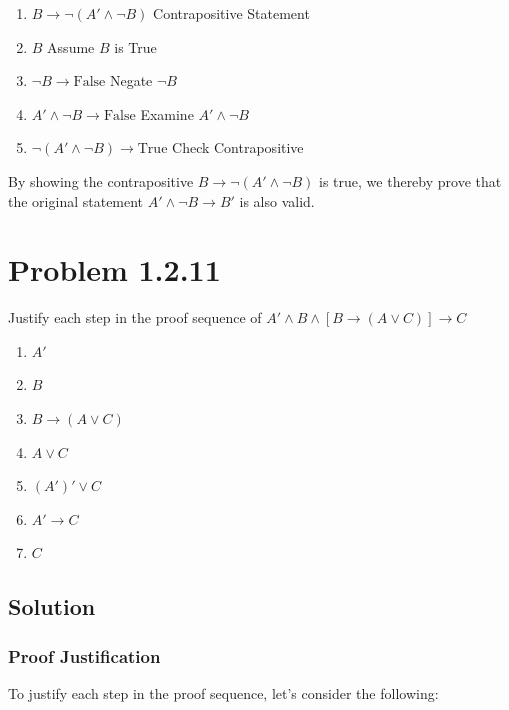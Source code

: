 \documentclass[12pt]{article}
\begin{document}
\begin{enumerate}
    \item \( B \to \lnot (A' \land \lnot B) \) \hfill Contrapositive Statement
    
    \item \( B \) \hfill Assume \( B \) is True
    
    \item \( \lnot B \to \text{False} \) \hfill Negate \( \lnot B \)
    
    \item \( A' \land \lnot B \to \text{False} \) \hfill Examine \( A' \land \lnot B \)
    
    \item \( \lnot (A' \land \lnot B) \to \text{True} \) \hfill Check Contrapositive
\end{enumerate}

By showing the contrapositive \( B \to \lnot (A' \land \lnot B) \) is true, we thereby prove that the original statement \( A' \land \lnot B \to B' \) is also valid.



\newpage
\section*{Problem 1.2.11}
Justify each step in the proof sequence of $A' \land B \land [B \rightarrow (A \lor C)] \rightarrow C$
\begin{enumerate}
\item $A'$
\item $B$
\item $B \rightarrow (A \lor C)$
\item $A \lor C$ 
\item $(A')' \lor C$ 
\item $A' \rightarrow C$ 
\item $C$
\end{enumerate}


\newpage
\subsection*{Solution}
\subsubsection*{Proof Justification}

To justify each step in the proof sequence, let's consider the following:
\end{document}
